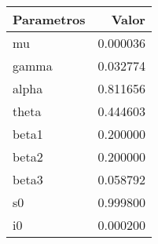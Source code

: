 \begin{tabular}{lr}
\toprule
Parametros &    Valor \\
\midrule
        mu & 0.000036 \\
     gamma & 0.032774 \\
     alpha & 0.811656 \\
     theta & 0.444603 \\
     beta1 & 0.200000 \\
     beta2 & 0.200000 \\
     beta3 & 0.058792 \\
        s0 & 0.999800 \\
        i0 & 0.000200 \\
\bottomrule
\end{tabular}

